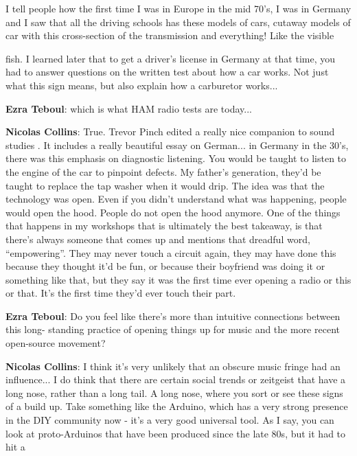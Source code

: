 I tell people how the first time I was in Europe in the mid 70’s, I was in Germany and I saw that all the driving schools has these models of cars, cutaway models of car with this cross-section of the transmission and everything! Like the visible
									
fish. I learned later that to get a driver’s license in Germany at that time, you had to answer questions on the written test about how a car works. Not just what this sign means, but also explain how a carburetor works...
					
\textbf{Ezra Teboul}: which is what HAM radio tests are today...
					
\textbf{Nicolas Collins}: True. Trevor Pinch edited a really nice companion to sound studies \citep{pinch2011} . It includes a really beautiful essay on German... in Germany in the 30’s, there was this emphasis on diagnostic listening. You would be taught to listen to the engine of the car to pinpoint defects. My father’s generation, they’d be taught to replace the tap washer when it would drip. The idea was that the technology was open. Even if you didn’t understand what was happening, people would open the hood. People do not open the hood anymore. One of the things that happens in my workshops that is ultimately the best takeaway, is that there’s always someone that comes up and mentions that dreadful word, ``empowering''. They may never touch a circuit again, they may have done this because they thought it’d be fun, or because their boyfriend was doing it or something like that, but they say it was the first time ever opening a radio or this or that. It’s the first time they’d ever touch their part.
					
\textbf{Ezra Teboul}: Do you feel like there’s more than intuitive connections between this long- standing practice of opening things up for music and the more recent open-source movement?
					
\textbf{Nicolas Collins}: I think it’s very unlikely that an obscure music fringe had an influence... I do think that there are certain social trends or zeitgeist that have a long nose, rather than a long tail. A long nose, where you sort or see these signs of a build up. Take something like the Arduino, which has a very strong presence in the DIY community now - it’s a very good universal tool. As I say, you can look at proto-Arduinos that have been produced since the late 80s, but it had to hit a
									
